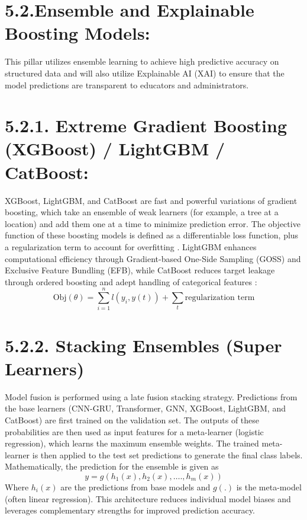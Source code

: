 \documentclass[twocolumn]{svjour3}
\begin{document}
\section{5.2.Ensemble and Explainable Boosting Models:}
This pillar utilizes ensemble learning to achieve high predictive accuracy on structured data and will also utilize Explainable AI (XAI) to ensure that the model predictions are transparent to educators and administrators.
\section{5.2.1. Extreme Gradient Boosting (XGBoost) / LightGBM / CatBoost:}
XGBoost, LightGBM, and CatBoost are fast and powerful variations of gradient boosting, which take an ensemble of weak learners (for example, a tree at a location) and add them one at a time to minimize prediction error. The objective function of these boosting models is defined as a differentiable loss function, plus a regularization term to account for overfitting \cite{28}. LightGBM enhances computational efficiency through Gradient-based One-Side Sampling (GOSS) and Exclusive Feature Bundling (EFB), while CatBoost reduces target leakage through ordered boosting and adept handling of categorical features \cite{29}:
\begin{equation}
\text{Obj}(\theta) = \sum_{i=1}^{n} l(y_i, y(t)) + \sum_{t} \text{regularization term}
\end{equation}

\section{5.2.2. Stacking Ensembles (Super Learners)}
Model fusion is performed using a late fusion stacking strategy. Predictions from the base learners (CNN-GRU, Transformer, GNN, XGBoost, LightGBM, and CatBoost) are first trained on the validation set. The outputs of these probabilities are then used as input features for a meta-learner (logistic regression), which learns the maximum ensemble weights. The trained meta-learner is then applied to the test set predictions to generate the final class labels. Mathematically, the prediction for the ensemble is given as
\begin{equation}
y = g(h_1(x),h_2(x),….,h_m(x))
\end{equation}
Where $h_i(x)$ are the predictions from base models and $g(.)$ is the meta-model (often linear regression). This architecture reduces individual model biases and leverages complementary strengths for improved prediction accuracy.
\end{document}
